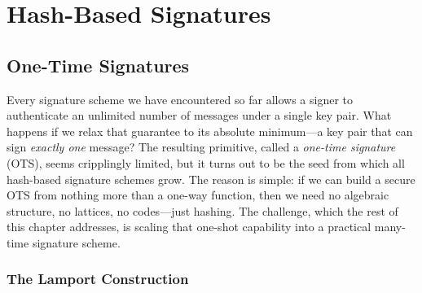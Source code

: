 \chapter{Hash-Based Signatures}
\label{ch:hash-based}





\section{One-Time Signatures}
\label{sec:ots}

Every signature scheme we have encountered so far allows a signer to authenticate an unlimited number of messages under a single key pair.  What happens if we relax that guarantee to its absolute minimum---a key pair that can sign \emph{exactly one} message?  The resulting primitive, called a \emph{one-time signature} (OTS), seems cripplingly limited, but it turns out to be the seed from which all hash-based signature schemes grow.  The reason is simple: if we can build a secure OTS from nothing more than a one-way function, then we need no algebraic structure, no lattices, no codes---just hashing.  The challenge, which the rest of this chapter addresses, is scaling that one-shot capability into a practical many-time signature scheme.

\subsection{The Lamport Construction}
\label{subsec:lamport}

